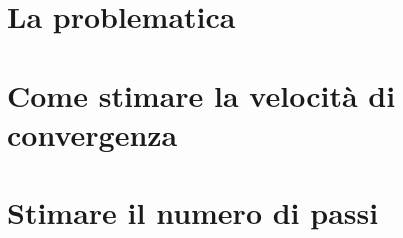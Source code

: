 \documentclass[\main/main.tex]{subfiles}
\begin{document}
\section{La problematica}
\section{Come stimare la velocità di convergenza}
\section{Stimare il numero di passi}
\end{document}
